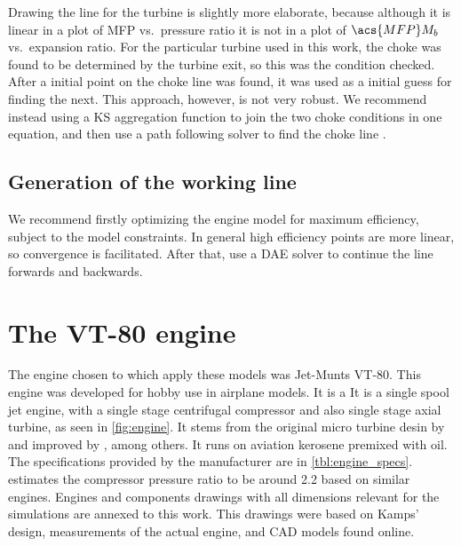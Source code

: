 \documentclass[tcc]{subfiles}
\begin{document}
Drawing the line for the turbine is slightly more elaborate, because although it is linear in a plot of \acs{MFP} vs.\ pressure ratio it is not in a plot of $\acs{MFP}M_b$ vs.\ expansion ratio.
For the particular turbine used in this work, the choke was found to be determined by the turbine exit, so this was the condition checked. After a initial point on the choke line was found, it was used as a initial guess for finding the next. This approach, however, is not very robust. We recommend instead using a KS aggregation function to join the two choke conditions in one equation, and then use a path following solver to find the choke line \cite{martins}.

\subsection{Generation of the working line}
We recommend firstly optimizing the engine model for maximum efficiency, subject to the model constraints. In general high efficiency points are more linear, so convergence is facilitated.
After that, use a \ac{DAE} solver to continue the line forwards and backwards.

\section{The VT-80 engine}
The engine chosen to which apply these models was Jet-Munts VT-80.
This engine was developed for hobby use in airplane models. It is a 
It is a single spool jet engine, with a single stage centrifugal compressor 
 and also single stage axial turbine, as seen in \cref{fig:engine}. It stems from the original micro turbine desin by \textcite{Schreckling1994} and improved by \textcite{Kamps1999}, among others. 
It runs on aviation kerosene premixed with oil.
The specifications provided by the manufacturer are in \cref{tbl:engine_specs}.
\textcite{bolsoni} estimates the compressor pressure ratio 
to be around 2.2 based on similar engines. Engines and components drawings with all dimensions relevant for the simulations are annexed to this work. This drawings were based on Kamps' design, measurements of the actual engine, and CAD models found online.
\end{document}
